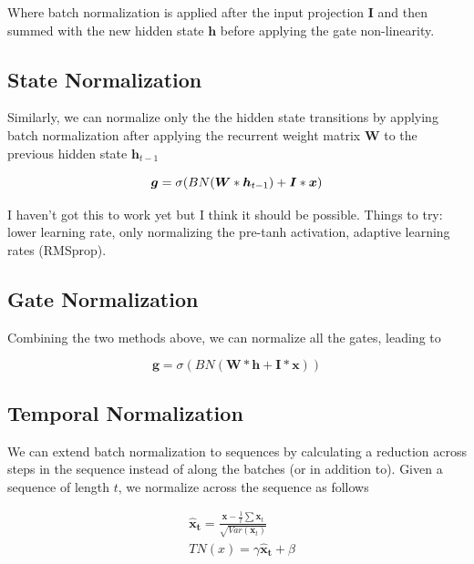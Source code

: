 \documentclass{article}
\begin{document}
Where batch normalization is applied after the input projection $\boldsymbol I$ and then summed with the new hidden state $\boldsymbol h$ before applying the gate non-linearity.

\subsection{State Normalization} Similarly, we can normalize only the the hidden state transitions by applying batch normalization after applying the recurrent weight matrix $\boldsymbol W$ to the previous hidden state $\boldsymbol h_{t-1}$

\begin{equation}
	\boldsymbol g = \sigma(BN(\boldsymbol W * \boldsymbol h_{t-1}) + \boldsymbol I * \boldsymbol x) \\
\end{equation}

I haven't got this to work yet but I think it should be possible. Things to try: lower learning rate, only normalizing the pre-tanh activation, adaptive learning rates (RMSprop). 

\subsection{Gate Normalization} Combining the two methods above, we can normalize all the gates, leading to 

\begin{equation}
	\boldsymbol g = \sigma(BN(\boldsymbol W * \boldsymbol h + \boldsymbol I * \boldsymbol x)) \nonumber
\end{equation}

\subsection{Temporal Normalization}
We can extend batch normalization to sequences by calculating a reduction across steps in the sequence instead of along the batches (or in addition to). Given a sequence of length $t$, we normalize across the sequence as follows

\begin{equation}
	\begin{split}
		& \boldsymbol{\hat x_t} = \frac{\boldsymbol x - \frac{1}{t} \sum \boldsymbol x_t}{\sqrt{Var(\boldsymbol x_t)}} \\
		& TN(x) = \gamma \boldsymbol{\hat x_t} + \beta
	\end{split}
\end{equation}
\end{document}
